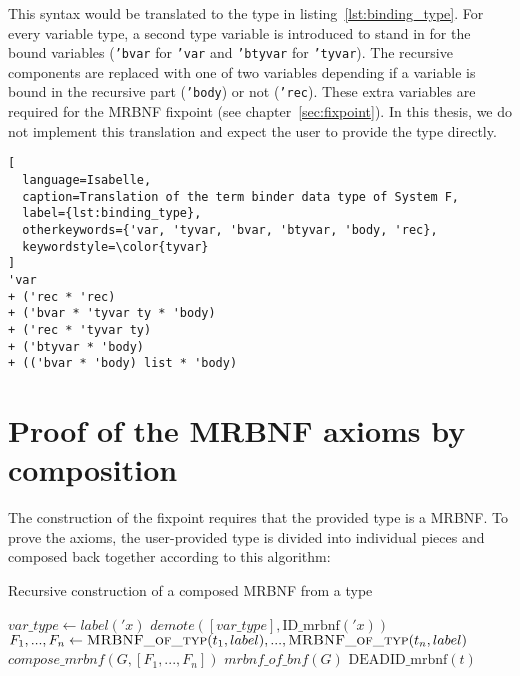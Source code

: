This syntax would be translated to the type in listing~\ref{lst:binding_type}. For every variable type, a second type variable is introduced to stand in for the bound variables (\texttt{\textcolor{tyvar}{'bvar}} for \texttt{\textcolor{tyvar}{'var}} and \texttt{\textcolor{tyvar}{'btyvar}} for \texttt{\textcolor{tyvar}{'tyvar}}). The recursive components are replaced with one of two variables depending if a variable is bound in the recursive part (\texttt{\textcolor{tyvar}{'body}}) or not (\texttt{\textcolor{tyvar}{'rec}}). These extra variables are required for the \ac{MRBNF} fixpoint (see chapter~\ref{sec:fixpoint}). In this thesis, we do not implement this translation and expect the user to provide the type directly.

\begin{lstlisting}[
  language=Isabelle,
  caption=Translation of the term binder data type of System F,
  label={lst:binding_type},
  otherkeywords={'var, 'tyvar, 'bvar, 'btyvar, 'body, 'rec},
  keywordstyle=\color{tyvar}
]
'var
+ ('rec * 'rec)
+ ('bvar * 'tyvar ty * 'body)
+ ('rec * 'tyvar ty)
+ ('btyvar * 'body)
+ (('bvar * 'body) list * 'body)
\end{lstlisting}

\section{Proof of the \ac{MRBNF} axioms by composition}

The construction of the fixpoint requires that the provided type is a \ac{MRBNF}. To prove the axioms, the user-provided type is divided into individual pieces and composed back together according to this algorithm:

\begin{algorithm}
\caption{Recursive construction of a composed \ac{MRBNF} from a type}\label{alg:mrbnf_of_typ}
\begin{algorithmic}[1]
    \State $\textit{var\_type}\gets label('x)$ \Comment{\textcolor{darkgreen}{is $'x$ Live, Free, Bound or Dead?}}
    \State \Return $\textit{demote}([\textit{var\_type}], \text{ID\_mrbnf}('x))$
    \State $F_1,...,F_n\gets \Call{MRBNF\_of\_typ}{t_1, label},...,\Call{MRBNF\_of\_typ}{t_n, label}$
    \State \Return $\textit{compose\_mrbnf}(G, [F_1,...,F_n])$
    \State $\textit{mrbnf\_of\_bnf}(G)$ \Comment{\textcolor{darkgreen}{Convert G to a MRBNF and register it for future use}}
    \State \Return {}
  \Else
    \State \Return $\text{DEADID\_mrbnf}(t)$
  \EndIf
\EndFunction
\end{algorithmic}
\end{algorithm}

